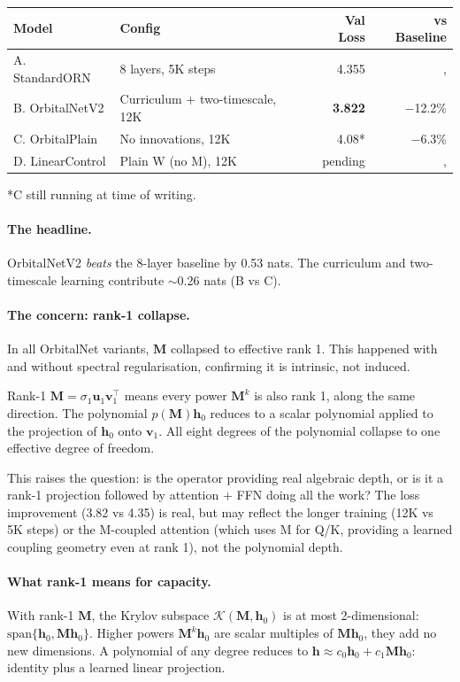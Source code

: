 \documentclass[11pt, a4paper]{article}
\newcommand{\M}{\mathbf{M}}
\newcommand{\h}{\mathbf{h}}
\theoremstyle{plain}
\theoremstyle{definition}
\theoremstyle{remark}
\begin{document}
\begin{center}\small
\begin{tabular}{llrr}
\toprule
\textbf{Model} & \textbf{Config} & \textbf{Val Loss} & \textbf{vs Baseline} \\
\midrule
A. StandardORN & 8 layers, 5K steps & 4.355 & ,  \\
B. OrbitalNetV2 & Curriculum + two-timescale, 12K & \textbf{3.822} & $-$12.2\% \\
C. OrbitalPlain & No innovations, 12K & 4.08* & $-$6.3\% \\
D. LinearControl & Plain W (no M), 12K & pending & ,  \\
\bottomrule
\end{tabular}
\end{center}
\noindent\small{*C still running at time of writing.}

\paragraph{The headline.}
OrbitalNetV2 \emph{beats} the 8-layer baseline by 0.53 nats.
The curriculum and two-timescale learning contribute $\sim$0.26 nats (B vs C).

\paragraph{The concern: rank-1 collapse.}
In all OrbitalNet variants, $\M$ collapsed to effective rank 1.
This happened with and without spectral regularisation, confirming it is intrinsic, not induced.

Rank-1 $\M = \sigma_1 \mathbf{u}_1 \mathbf{v}_1^\top$ means every power $\M^k$ is also rank 1, along the same direction.
The polynomial $p(\M) \h_0$ reduces to a scalar polynomial applied to the projection of $\h_0$ onto $\mathbf{v}_1$.
All eight degrees of the polynomial collapse to one effective degree of freedom.

This raises the question: is the operator providing real algebraic depth, or is it a rank-1 projection followed by attention + FFN doing all the work?
The loss improvement (3.82 vs 4.35) is real, but may reflect the longer training (12K vs 5K steps) or the M-coupled attention (which uses M for Q/K, providing a learned coupling geometry even at rank 1), not the polynomial depth.

\paragraph{What rank-1 means for capacity.}
With rank-1 $\M$, the Krylov subspace $\mathcal{K}(\M, \h_0)$ is at most 2-dimensional: $\text{span}\{\h_0, \M \h_0\}$.
Higher powers $\M^k \h_0$ are scalar multiples of $\M \h_0$, they add no new dimensions.
A polynomial of any degree reduces to $\h \approx c_0 \h_0 + c_1 \M \h_0$: identity plus a learned linear projection.
\end{document}
